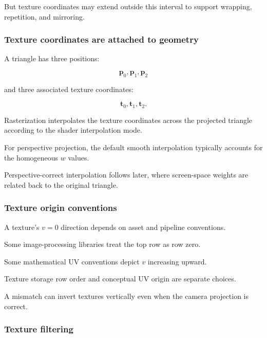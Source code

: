 But texture coordinates may extend outside this interval to support wrapping, repetition, and mirroring.

\subsubsection{Texture coordinates are attached to geometry}\label{02-foundations-ii-ch032-texture-coordinates-are-attached-to-geometry}

\hypertarget{02-foundations-ii-ch032-texture-coordinates-are-attached-to-geometry}{}

A triangle has three positions:

\[
 \mathbf p_0,\mathbf p_1,\mathbf p_2
\]

and three associated texture coordinates:

\[
 \mathbf t_0,\mathbf t_1,\mathbf t_2.
\]

Rasterization interpolates the texture coordinates across the projected triangle according to the shader interpolation mode.

For perspective projection, the default smooth interpolation typically accounts for the homogeneous \(w\) values.

Perspective-correct interpolation follows later, where screen-space weights are related back to the original triangle.

\subsubsection{Texture origin conventions}\label{02-foundations-ii-ch032-texture-origin-conventions}

\hypertarget{02-foundations-ii-ch032-texture-origin-conventions}{}

A texture's \(v=0\) direction depends on asset and pipeline conventions.

Some image-processing libraries treat the top row as row zero.

Some mathematical UV conventions depict \(v\) increasing upward.

Texture storage row order and conceptual UV origin are separate choices.

A mismatch can invert textures vertically even when the camera projection is correct.

\subsubsection{Texture filtering}\label{02-foundations-ii-ch032-texture-filtering}

